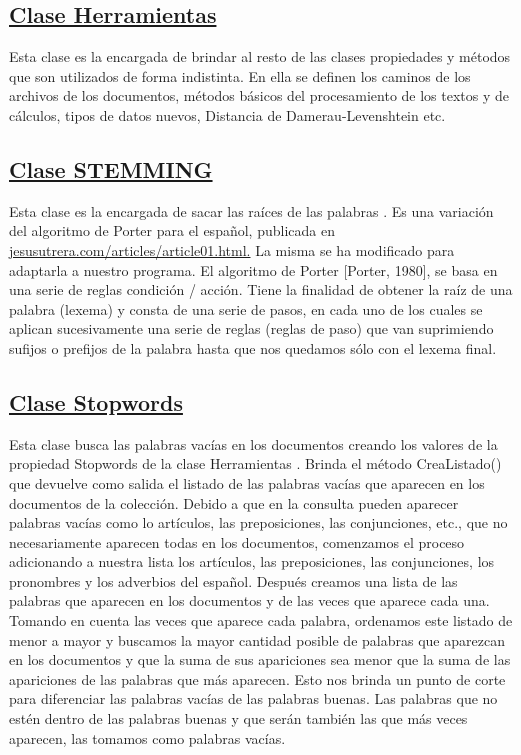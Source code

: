 \documentclass{article}%
\begin{document}
    \subsection{\underline{Clase Herramientas}}
    Esta clase es la encargada de brindar al resto de las clases propiedades y métodos que son utilizados de forma indistinta. En ella se definen los caminos de los archivos de los documentos, métodos básicos del procesamiento de los textos y de cálculos, tipos de datos nuevos, Distancia de Damerau-Levenshtein etc.
    \subsection{\underline{Clase STEMMING}}
    Esta clase es la encargada de sacar las raíces de las palabras . Es una variación del algoritmo de Porter para el español, publicada en \url{jesusutrera.com/articles/article01.html.}
    La misma se ha modificado para adaptarla a nuestro programa.
El algoritmo de Porter [Porter, 1980], se basa en una serie de reglas condición / acción. Tiene la finalidad de obtener la raíz de una palabra (lexema) y consta de una serie de pasos, en cada uno de los cuales se aplican sucesivamente una serie de reglas (reglas de paso) que van suprimiendo sufijos o prefijos de la palabra hasta que nos quedamos sólo con el lexema final.
    \subsection{\underline{Clase Stopwords}}
    Esta clase busca las palabras vacías en los documentos creando los valores de la propiedad Stopwords de la clase Herramientas . Brinda el método CreaListado() que devuelve como salida el listado de las palabras vacías que aparecen en los documentos de la colección.
Debido a que en la consulta pueden aparecer palabras vacías como lo artículos, las preposiciones, las conjunciones, etc., que no necesariamente aparecen todas en los documentos, comenzamos el proceso adicionando a nuestra lista los artículos, las preposiciones, las conjunciones, los pronombres y los adverbios del español.
Después creamos una lista de las palabras que aparecen en los documentos y de las veces que aparece cada una. Tomando en cuenta las veces que aparece cada palabra, ordenamos este listado de menor a mayor y buscamos la mayor cantidad posible de palabras que aparezcan en los documentos y que la suma de sus apariciones sea menor que la suma de las apariciones de las palabras que más aparecen. Esto nos brinda un punto de corte para diferenciar las palabras vacías de las palabras buenas.
Las palabras que no estén dentro de las palabras buenas y que serán también las que más veces aparecen, las tomamos como palabras vacías.
\end{document}
